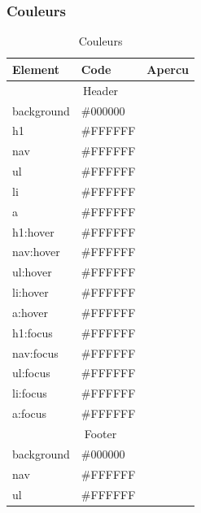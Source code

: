 \documentclass[letter, 11pt]{report}
\begin{document}
\subsubsection{Couleurs}

\begin{table}[h]
	\caption{Couleurs}
	\begin{center}
		\begin{tabular}{|l|l|l|}
		\hline
		Element    					& Code     & Apercu \\ \hline
		\multicolumn{3}{|c|}{Header} \\ \hline
		background 					& \#000000 & \cellcolor[HTML]{000000} \\ \hline
		h1         					& \#FFFFFF & \cellcolor[HTML]{FFFFFF} \\ \hline
		nav        					& \#FFFFFF & \cellcolor[HTML]{FFFFFF} \\ \hline
		ul         					& \#FFFFFF & \cellcolor[HTML]{FFFFFF} \\ \hline
		li         					& \#FFFFFF & \cellcolor[HTML]{FFFFFF} \\ \hline
		a          					& \#FFFFFF & \cellcolor[HTML]{FFFFFF} \\ \hline
		h1:hover   					& \#FFFFFF & \cellcolor[HTML]{FFFFFF} \\ \hline
		nav:hover  					& \#FFFFFF & \cellcolor[HTML]{FFFFFF} \\ \hline
		ul:hover   					& \#FFFFFF & \cellcolor[HTML]{FFFFFF} \\ \hline
		li:hover   					& \#FFFFFF & \cellcolor[HTML]{FFFFFF} \\ \hline
		a:hover    					& \#FFFFFF & \cellcolor[HTML]{FFFFFF} \\ \hline
		h1:focus   					& \#FFFFFF & \cellcolor[HTML]{FFFFFF} \\ \hline
		nav:focus  					& \#FFFFFF & \cellcolor[HTML]{FFFFFF} \\ \hline
		ul:focus   					& \#FFFFFF & \cellcolor[HTML]{FFFFFF} \\ \hline
		li:focus   					& \#FFFFFF & \cellcolor[HTML]{FFFFFF} \\ \hline
		a:focus    					& \#FFFFFF & \cellcolor[HTML]{FFFFFF} \\ \hline
		\multicolumn{3}{|c|}{Footer} \\ \hline
		background 					& \#000000 & \cellcolor[HTML]{000000} \\ \hline
		nav        					& \#FFFFFF & \cellcolor[HTML]{FFFFFF} \\ \hline
		ul         					& \#FFFFFF & \cellcolor[HTML]{FFFFFF} \\ \hline

\end{tabular}
\end{center}
\end{table}
\end{document}
